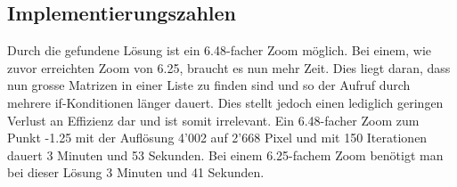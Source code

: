 \subsection{Implementierungszahlen}
Durch die gefundene Lösung ist ein 6.48-facher Zoom möglich. Bei einem, wie zuvor erreichten Zoom von 6.25, braucht es nun mehr Zeit. Dies liegt daran, dass nun grosse Matrizen in einer Liste zu finden sind und so der Aufruf durch mehrere if-Konditionen länger dauert. Dies stellt jedoch einen lediglich geringen Verlust an Effizienz dar und ist somit irrelevant. Ein 6.48-facher Zoom zum Punkt -1.25 mit der Auflösung 4’002 auf 2’668 Pixel und mit 150 Iterationen dauert 3 Minuten und 53 Sekunden. Bei einem 6.25-fachem Zoom benötigt man bei dieser Lösung 3 Minuten und 41 Sekunden.
